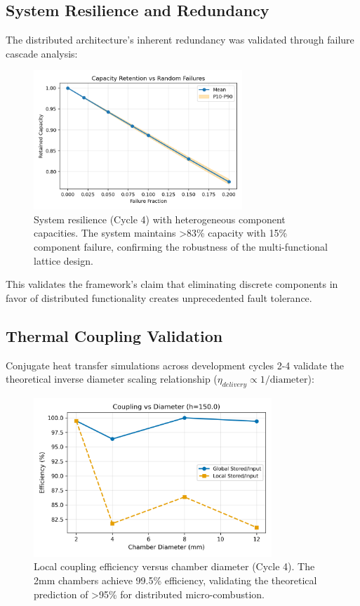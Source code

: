 \subsection{System Resilience and Redundancy}

The distributed architecture's inherent redundancy was validated through failure cascade analysis:

\begin{figure}[H]
    \centering
    \includegraphics[width=0.7\textwidth]{figures/simulations/resilience_capacity_curve.png}
    \caption{System resilience (Cycle 4) with heterogeneous component capacities. The system maintains >83\% capacity with 15\% component failure, confirming the robustness of the multi-functional lattice design.}
    \label{fig:resilience}
\end{figure}

This validates the framework's claim that eliminating discrete components in favor of distributed functionality creates unprecedented fault tolerance.

\subsection{Thermal Coupling Validation}

Conjugate heat transfer simulations across development cycles 2-4 validate the theoretical inverse diameter scaling relationship ($\eta_{delivery} \propto 1/\text{diameter}$):

\begin{figure}[H]
    \centering
    \includegraphics[width=0.8\textwidth]{figures/simulations/coupling_vs_diameter_h150.0_DEV_CYCLE_4.png}
    \caption{Local coupling efficiency versus chamber diameter (Cycle 4). The 2mm chambers achieve 99.5\% efficiency, validating the theoretical prediction of >95\% for distributed micro-combustion.}
    \label{fig:coupling_cycle4}
\end{figure}

